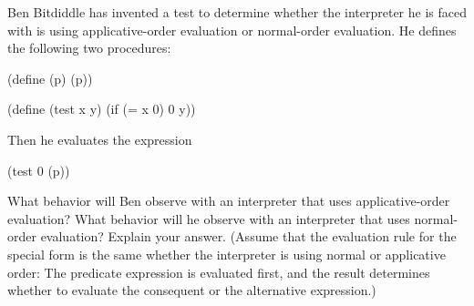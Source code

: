\begin{exercise}
	\label{Exercise 1.5}
	Ben Bitdiddle has invented a test to determine whether the interpreter he is faced with is using applicative-order evaluation or normal-order evaluation.
	He defines the following two procedures:
	\begin{scheme}
	  (define (p) (p))

	  (define (test x y)
	    (if (= x 0) 0 y))
	\end{scheme}
	Then he evaluates the expression
	\begin{scheme}
	  (test 0 (p))
	\end{scheme}
	What behavior will Ben observe with an interpreter that uses applicative-order evaluation?
	What behavior will he observe with an interpreter that uses normal-order evaluation?
	Explain your answer.
	(Assume that the evaluation rule for the special form  is the same whether the interpreter is using normal or applicative order:
	The predicate expression is evaluated first, and the result determines whether to evaluate the consequent or the alternative expression.)
\end{exercise}
